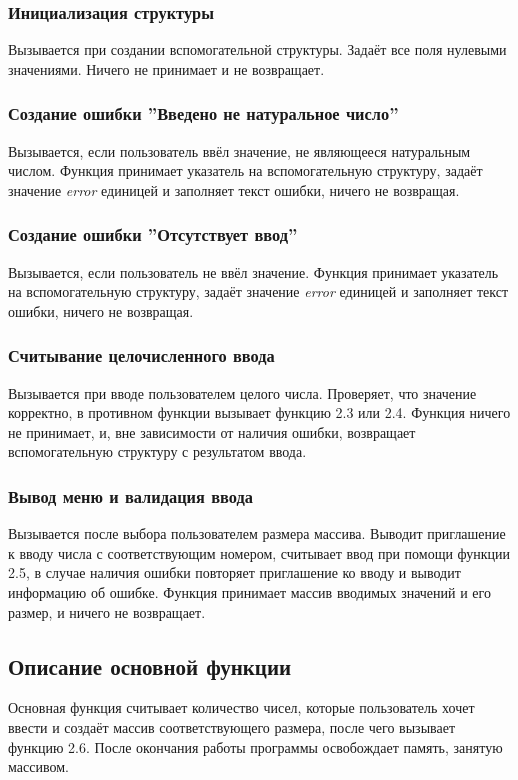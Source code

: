 \documentclass[a4paper, 12pt]{article}
\begin{document}
\subsubsection{Инициализация структуры}
Вызывается при создании вспомогательной структуры. Задаёт все поля нулевыми
значениями. Ничего не принимает и не возвращает.


\subsubsection{Создание ошибки ''Введено не натуральное число''}
Вызывается, если пользователь ввёл значение, не являющееся натуральным числом.
Функция принимает указатель на вспомогательную структуру, задаёт значение \textit{error}
единицей и заполняет текст ошибки, ничего не возвращая.


\subsubsection{Создание ошибки ''Отсутствует ввод''}
Вызывается, если пользователь не ввёл значение. Функция принимает указатель 
на вспомогательную структуру, задаёт значение \textit{error}
единицей и заполняет текст ошибки, ничего не возвращая.


\subsubsection{Считывание целочисленного ввода}
Вызывается при вводе пользователем целого числа. Проверяет, что значение корректно, в
противном функции вызывает функцию 2.3 или 2.4. Функция ничего не принимает, и, вне зависимости от
наличия ошибки, возвращает вспомогательную структуру с результатом ввода.


\subsubsection{Вывод меню и валидация ввода}
Вызывается после выбора пользователем размера массива. Выводит приглашение к вводу
числа с соответствующим номером, считывает ввод при помощи функции 2.5, в случае наличия
ошибки повторяет приглашение ко вводу и выводит информацию об ошибке. Функция принимает
массив вводимых значений и его размер, и ничего не возвращает.


\subsection{Описание основной функции}
Основная функция считывает количество чисел, которые пользователь хочет ввести и
создаёт массив соответствующего размера, после чего вызывает функцию 2.6. После
окончания работы программы освобождает память, занятую массивом.
\end{document}
